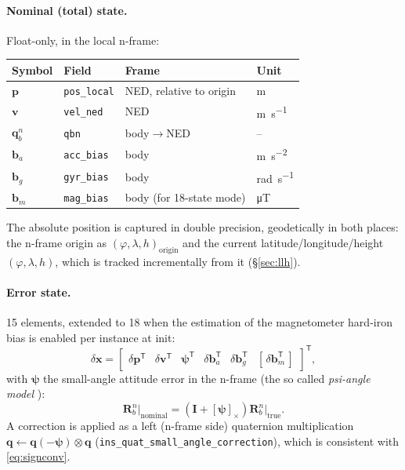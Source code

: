 \documentclass[11pt,a4paper]{article}
\newcommand{\vect}[1]{\bm{#1}}
\newcommand{\mat}[1]{\bm{#1}}
\newcommand{\T}{^{\mathsf{T}}}
\newcommand{\cross}[1]{\left[#1\right]_{\times}}   %
\newcommand{\nframe}{n}
\newcommand{\bframe}{b}
\newcommand{\Rbn}{\mat{R}_{\bframe}^{\nframe}}
\newcommand{\qbn}{\vect{q}_{\bframe}^{\nframe}}
\newcommand{\code}[1]{\texttt{#1}}
\begin{document}
\paragraph{Nominal (total) state.} Float-only, in the local n-frame:
\begin{center}
\begin{tabular}{@{}llll@{}}
\toprule
Symbol & Field & Frame & Unit \\
\midrule
$\vect{p}$ & \code{pos\_\allowbreak{}local} & NED, relative to origin & \si{\metre} \\
$\vect{v}$ & \code{vel\_\allowbreak{}ned}   & NED & \si{\metre\per\second} \\
$\qbn$     & \code{qbn}        & body$\to$NED & -- \\
$\vect{b}_a$ & \code{acc\_\allowbreak{}bias} & body & \si{\metre\per\second\squared} \\
$\vect{b}_g$ & \code{gyr\_\allowbreak{}bias} & body & \si{\radian\per\second} \\
$\vect{b}_m$ & \code{mag\_\allowbreak{}bias} & body (for 18-state mode) & \si{\micro\tesla} \\
\bottomrule
\end{tabular}
\end{center}
The absolute position is captured in double precision, geodetically in
both places: the n-frame origin as $(\varphi,\lambda,h)_{\text{origin}}$
and the current latitude/longitude/height $(\varphi,\lambda,h)$, which is tracked
incrementally from it (\S\ref{sec:llh}).

\paragraph{Error state.} 15 elements, extended to 18 when the estimation of the
magnetometer hard-iron bias is enabled per instance at init:
\begin{equation}
  \delta\vect{x} =
  \begin{bmatrix}
    \delta\vect{p}\T & \delta\vect{v}\T & \vect{\psi}\T &
    \delta\vect{b}_a\T & \delta\vect{b}_g\T &
    [\,\delta\vect{b}_m\T\,]
  \end{bmatrix}\T ,
\end{equation}
with $\vect{\psi}$ the small-angle attitude error in the n-frame
(the so called \emph{psi-angle model} \cite[Sec.~8.2]{wendel2011}):
\begin{equation}
  \Rbn\big|_{\text{nominal}}
  = \left(\mat{I} + \cross{\vect{\psi}}\right)
    \Rbn\big|_{\text{true}} .
  \label{eq:psimodel}
\end{equation}
A correction is applied as a left (n-frame side) quaternion
multiplication $\vect{q} \leftarrow \vect{q}(-\vect{\psi}) \otimes
\vect{q}$ (\code{ins\_\allowbreak{}quat\_\allowbreak{}small\_\allowbreak{}angle\_\allowbreak{}correction}), which is consistent
with \eqref{eq:signconv}.
\end{document}
